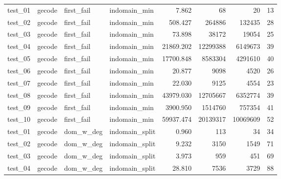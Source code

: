 \begin{longtable}{l l l l r r r r}
    test\_01         & gecode          & first\_fail       & indomain\_min     & 7.862              & 68             & 20                & 13             \\
    test\_02         & gecode          & first\_fail       & indomain\_min     & 508.427            & 264886         & 132435            & 28             \\
    test\_03         & gecode          & first\_fail       & indomain\_min     & 73.898             & 38172          & 19054             & 25             \\
    test\_04         & gecode          & first\_fail       & indomain\_min     & 21869.202          & 12299388       & 6149673           & 39             \\
    test\_05         & gecode          & first\_fail       & indomain\_min     & 17700.848          & 8583304        & 4291610           & 40             \\
    test\_06         & gecode          & first\_fail       & indomain\_min     & 20.877             & 9098           & 4520              & 26             \\
    test\_07         & gecode          & first\_fail       & indomain\_min     & 22.030             & 9125           & 4554              & 23             \\
    test\_08         & gecode          & first\_fail       & indomain\_min     & 43979.030          & 12705667       & 6352774           & 39             \\
    test\_09         & gecode          & first\_fail       & indomain\_min     & 3900.950           & 1514760        & 757354            & 41             \\
    test\_10         & gecode          & first\_fail       & indomain\_min     & 59937.474          & 20139317       & 10069609          & 52             \\
    \midrule
    test\_01         & gecode          & dom\_w\_deg       & indomain\_split   & 0.960              & 113            & 34                & 34             \\
    test\_02         & gecode          & dom\_w\_deg       & indomain\_split   & 9.232              & 3150           & 1549              & 71             \\
    test\_03         & gecode          & dom\_w\_deg       & indomain\_split   & 3.973              & 959            & 451               & 69             \\
    test\_04         & gecode          & dom\_w\_deg       & indomain\_split   & 28.810             & 7536           & 3729              & 88             \\

\end{longtable}
